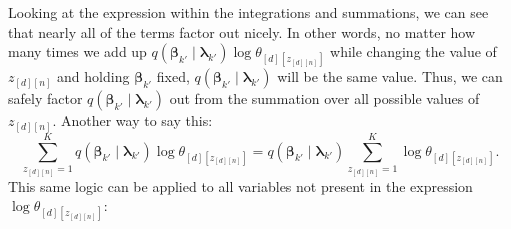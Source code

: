 \documentclass[12pt]{article}
\begin{document}
Looking at the expression within the integrations and summations, we can see
that nearly all of the terms factor out nicely.  In other words, no matter how
many times we add up $q(\bm{\beta}_{k'} \mid
\bm{\lambda}_{k'})\log\theta_{[d][z_{[d][n]}]}$ while changing the value of
$z_{[d][n]}$ and holding $\bm{\beta}_{k'}$ fixed, $q(\bm{\beta}_{k'} \mid
\bm{\lambda}_{k'})$ will be the same value.  Thus, we can safely factor
$q(\bm{\beta}_{k'} \mid \bm{\lambda}_{k'})$ out from the summation over all
possible values of $z_{[d][n]}$.  Another way to say this:
\begin{equation}
    \sum_{z_{[d][n]}=1}^{K} q(\bm{\beta}_{k'} \mid \bm{\lambda}_{k'}) \log
    \theta_{[d][z_{[d][n]}]} = q(\bm{\beta}_{k'} \mid \bm{\lambda}_{k'})
    \sum_{z_{[d][n]}=1}^{K} \log \theta_{[d][z_{[d][n]}]}.
\end{equation}
This same logic can be applied to all variables not present in the expression
$\log \theta_{[d][z_{[d][n]}]}$:
\end{document}
